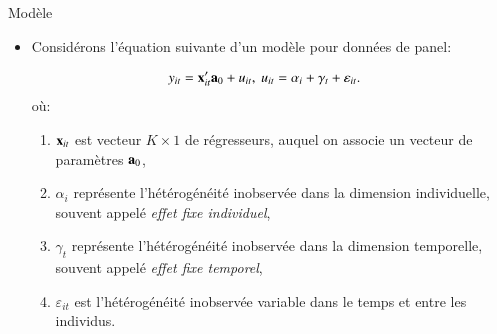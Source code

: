 \begin{frame}[allowframebreaks]{Modèle}
    \begin{itemize}
        \item Considérons l'équation suivante d'un modèle pour données de panel:

        \begin{align}
        y_{it}&={\mathbf x}_{it}^\prime{\mathbf a}_0+ u_{it}, \ u_{it} = \alpha_i + \gamma_t + \varepsilon_{it}.
        \label{eq6}
        \end{align}
        où: 
        \begin{enumerate}[$\star$]
        \item ${\mathbf x}_{it}$ est vecteur $K \times 1$ de régresseurs, 
        auquel on associe un vecteur de paramètres ${\mathbf a}_0$,
        \item $\alpha_i$ représente l'hétérogénéité inobservée dans la dimension 
        individuelle, souvent appelé \emph{effet fixe individuel},
        \item $\gamma_t$ représente l'hétérogénéité inobservée dans la dimension 
        temporelle, souvent appelé \emph{effet fixe temporel},
        \item $\varepsilon_{it}$ est l'hétérogénéité inobservée 
        variable dans le temps et entre les individus.
        \end{enumerate}       
    \end{itemize}
\end{frame}

